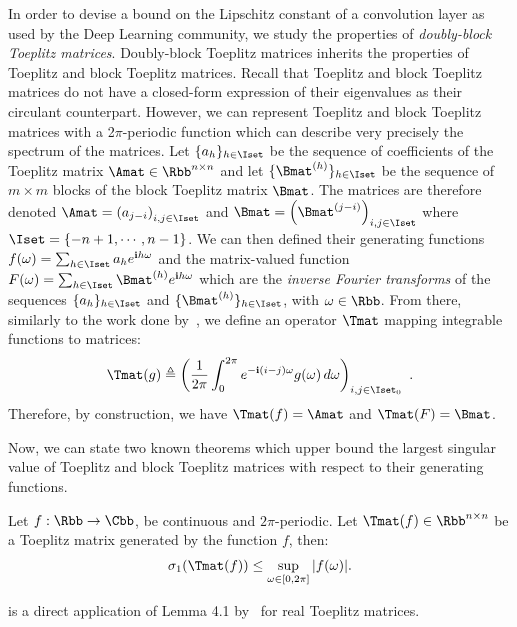 In order to devise a bound on the Lipschitz constant of a convolution layer as used by the Deep Learning community, we study the properties of \emph{doubly-block Toeplitz matrices}. 
Doubly-block Toeplitz matrices inherits the properties of Toeplitz and block Toeplitz matrices.
Recall that Toeplitz and block Toeplitz matrices do not have a closed-form expression of their eigenvalues as their circulant counterpart.
However, we can represent Toeplitz and block Toeplitz matrices with a 2$\pi$-periodic function which can describe very precisely the spectrum of the matrices. 
Let $\{a_h\}_{h \in \Iset}$ be the sequence of coefficients of the Toeplitz matrix $\Amat \in \Rbb^{n\times n}$ and let $\{\Bmat^{(h)}\}_{h \in \Iset}$ be the sequence of $m\times m$ blocks of the block Toeplitz matrix $\Bmat$.
The matrices are therefore denoted $\Amat = \leftmat a_{j-i} \rightmat_{i,j \in \Iset}$ and $\Bmat = \leftmat \Bmat^{(j-i)} \rightmat_{i,j \in \Iset}$ where $\Iset = \left\{ -n+1, \cdots, n-1 \right\}$.
We can then defined their generating functions $f(\omega) = \sum_{h \in \Iset} a_h e^{\ci h \omega}$ and the matrix-valued function $F(\omega) = \sum_{h \in \Iset} \Bmat^{(h)} e^{\ci h \omega}$ which are the \emph{inverse Fourier transforms} of the sequences $\{a_h\}_{h \in \Iset}$ and $\{\Bmat^{(h)}\}_{h \in \Iset}$, with $\omega \in \Rbb$.
From there, similarly to the work done by~\citet{grenander1958toeplitz}, we define an operator $\Tmat$ mapping integrable functions to matrices:
\begin{equation} \label{equation:expression_toeplitz_matrix}
  \Tmat(g)  \triangleq\leftmat\frac{1}{2\pi}\int_{0}^{2\pi}e^{-\ci(i-j)\omega}g(\omega)\,d\omega\rightmat_{i,j \in \Iset_0} \enspace.
\end{equation}
Therefore, by construction, we have $\Tmat(f) = \Amat$ and $\Tmat(F) = \Bmat$.

Now, we can state two known theorems which upper bound the largest singular value of Toeplitz and block Toeplitz matrices with respect to their generating functions.
\begin{theorem} \label{theorem:teoplitz_sup_singular}
  Let $f: \Rbb \rightarrow \Cbb$, be continuous and $2\pi$-periodic. Let $\Tmat(f) \in \Rbb^{n \times n}$ be a Toeplitz matrix generated by the function $f$, then:
  \begin{align}
    \sigma_1 \left( \Tmat(f) \right) \leq \sup_{\omega \in [0, 2\pi]} |f(\omega)|.
  \end{align}
  \removespace
\end{theorem}
\noindent
{} is a direct application of  Lemma 4.1 by~\citet{gray2006toeplitz} for real Toeplitz matrices. 

